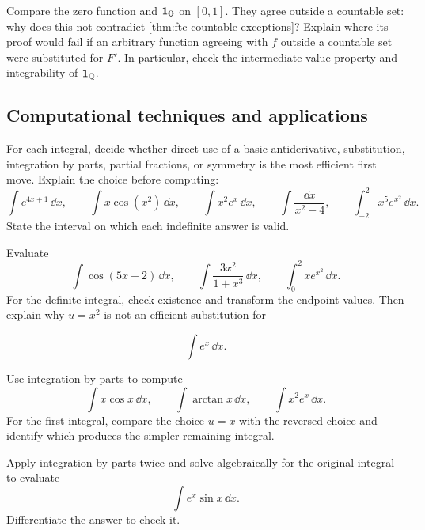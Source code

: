 \begin{exercise}
Compare the zero function and $\mathbf1_{\mathbb{Q}}$ on $[0,1]$. They agree
outside a countable set: why does this not contradict
\cref{thm:ftc-countable-exceptions}? Explain where its proof would fail
if an arbitrary function agreeing with $f$ outside a countable set were
substituted for $F'$. In particular, check the intermediate value property
and integrability of $\mathbf1_{\mathbb{Q}}$.
\end{exercise}

\subsection*{Computational techniques and applications}

\begin{exercise}
For each integral, decide whether direct use of a basic antiderivative,
substitution, integration by parts, partial fractions, or symmetry is the
most efficient first move. Explain the choice before computing:
\[
\int e^{4x+1}\,\dd x,
\qquad
\int x\cos(x^2)\,\dd x,
\qquad
\int x^2e^x\,\dd x,
\qquad
\int\frac{\dd x}{x^2-4},
\qquad
\int_{-2}^{2}x^5e^{x^2}\,\dd x.
\]
State the interval on which each indefinite answer is valid.
\end{exercise}

\begin{exercise}
Evaluate
\[
\int\cos(5x-2)\,\dd x,
\qquad
\int\frac{3x^2}{1+x^3}\,\dd x,
\qquad
\int_0^2 xe^{x^2}\,\dd x.
\]
For the definite integral, check existence and transform the endpoint values.
Then explain why \(u=x^2\) is not an efficient substitution for

\[
\int e^x\,\dd x.
\]

\end{exercise}

\begin{exercise}
Use integration by parts to compute
\[
\int x\cos x\,\dd x,
\qquad
\int\arctan x\,\dd x,
\qquad
\int x^2e^x\,\dd x.
\]
For the first integral, compare the choice \(u=x\) with the reversed choice
and identify which produces the simpler remaining integral.
\end{exercise}

\begin{exercise}
Apply integration by parts twice and solve algebraically for the original
integral to evaluate
\[
\int e^x\sin x\,\dd x.
\]
Differentiate the answer to check it.
\end{exercise}

